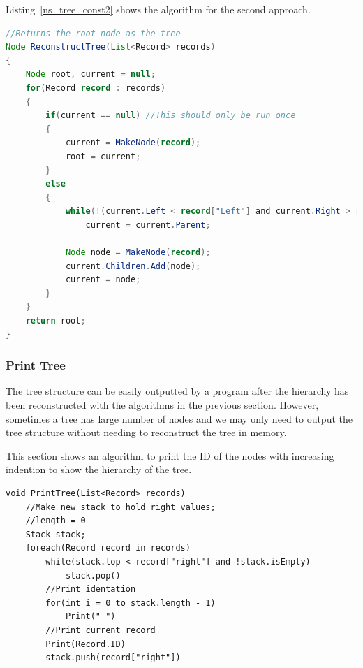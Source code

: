 Listing~\ref{ns_tree_const2} shows the algorithm for the second approach.

\begin{lstlisting}[language=java,style=java,caption={Tree reconstruction using Left and Right value},label=ns_tree_const2]
//Returns the root node as the tree
Node ReconstructTree(List<Record> records)
{
    Node root, current = null;
    for(Record record : records)
    {
        if(current == null) //This should only be run once
        {
            current = MakeNode(record);
            root = current;
        }        
        else
		{
            while(!(current.Left < record["Left"] and current.Right > record["Right"]))
                current = current.Parent;
                
            Node node = MakeNode(record);
            current.Children.Add(node);
            current = node;
        }
    }
    return root;
}
\end{lstlisting}	

\subsubsection{Print Tree}

The tree structure can be easily outputted by a program after the hierarchy has been reconstructed with the algorithms in the previous section. However, sometimes a tree has large number of nodes and we may only need to output the tree structure without needing to reconstruct the tree in memory.

This section shows an algorithm to print the ID of the nodes with increasing indention to show the hierarchy of the tree.

\begin{lstlisting}[caption={Tree reconstruction using Left and Right value},label=ns_print_tree]
void PrintTree(List<Record> records)
	//Make new stack to hold right values; 
	//length = 0
	Stack stack;
	foreach(Record record in records)
		while(stack.top < record["right"] and !stack.isEmpty)
			stack.pop()
		//Print identation
		for(int i = 0 to stack.length - 1) 
			Print(" ")
		//Print current record
		Print(Record.ID)
		stack.push(record["right"])
\end{lstlisting}
